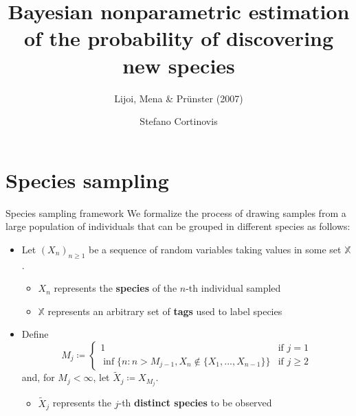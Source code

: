 \documentclass[11pt]{beamer}
\title[Lijoi et al. (2007)]{Bayesian nonparametric estimation of the probability of discovering new species}
\subtitle{Lijoi, Mena \& Pr{\"u}nster (2007)}
\author{Stefano Cortinovis}
\date[20605 - Machine Learning II]{\displaydate{date}}
\begin{document}
\nocite{*}

\begin{frame}
\titlepage
\end{frame}

\section{Species sampling}

\begin{frame}[t]{Species sampling framework}
We formalize the process of drawing samples from a large population of individuals that can be grouped in different species as follows:
\begin{itemize}
    \item<2-> Let \((X_n)_{n \geq 1}\) be a sequence of random variables taking values in some set \(\mathbb{X}\).
    \begin{itemize}
        \item \(X_n\) represents the \textbf{species} of the \(n\)-th individual sampled
        \item \(\mathbb{X}\) represents an arbitrary set of \textbf{tags} used to label species
    \end{itemize}
    \item<3-> Define
    \begin{equation*}
        M_j \coloneqq 
        \begin{cases}
            1 & \text{if } j = 1\\
            \inf\{n \colon n > M_{j-1}, X_n \notin \{X_1,...,X_{n-1}\}\} & \text{if } j \geq 2
        \end{cases}
    \end{equation*}
    and, for \(M_j < \infty\), let \(\tilde{X}_j \coloneqq X_{M_j}\).
    \begin{itemize}
        \item \(\tilde{X}_j\) represents the \(j\)-th \textbf{distinct species} to be observed
    \end{itemize}
\end{itemize}
\end{frame}
\end{document}
